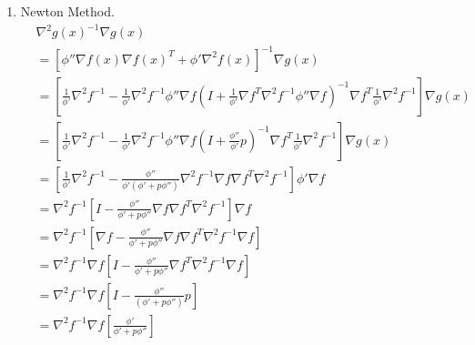 \documentclass[12pt, letterpaper, twoside]{article}
\begin{document}
\begin{enumerate}
    \item Newton Method.
    \begin{align*}
        &\nabla^2g(x)^{-1}\nabla g(x)\\
        &= [\phi''\nabla f(x)\nabla f(x)^T+\phi'\nabla^2 f(x)]^{-1}\nabla g(x)\\
        &=\left[\frac{1}{\phi'}\nabla^2 f^{-1}-\frac{1}{\phi'}\nabla^2 f^{-1}\phi''\nabla f(I+\frac{1}{\phi'}\nabla f^T\nabla^2 f^{-1}\phi''\nabla f)^{-1}\nabla f^T\frac{1}{\phi'}\nabla^2 f^{-1}\right]\nabla g(x)\\
        &=\left[\frac{1}{\phi'}\nabla^2 f^{-1}-\frac{1}{\phi'}\nabla^2 f^{-1}\phi''\nabla f(I+\frac{\phi''}{\phi'}p)^{-1}\nabla f^T\frac{1}{\phi'}\nabla^2 f^{-1}\right]\nabla g(x)\\
        &=\left[\frac{1}{\phi'}\nabla^2 f^{-1}-\frac{\phi''}{\phi'(\phi'+p\phi'')}\nabla^2 f^{-1}\nabla f\nabla f^T\nabla^2 f^{-1}\right]\phi'\nabla f\\
        &=\nabla^2 f^{-1}\left[I-\frac{\phi''}{\phi'+p\phi''}\nabla f\nabla f^T\nabla^2 f^{-1}\right]\nabla f\\
        &=\nabla^2 f^{-1}\left[\nabla f-\frac{\phi''}{\phi'+p\phi''}\nabla f\nabla f^T\nabla^2 f^{-1}\nabla f\right]\\
        &=\nabla^2 f^{-1}\nabla f\left[I-\frac{\phi''}{\phi'+p\phi''}\nabla f^T\nabla^2 f^{-1}\nabla f\right]\\
        &=\nabla^2 f^{-1}\nabla f\left[I-\frac{\phi''}{(\phi'+p\phi'')}p\right]\\
        &=\nabla^2 f^{-1}\nabla f\left[\frac{\phi'}{\phi'+p\phi''}\right]\
    \end{align*}

\end{enumerate}
\end{document}
